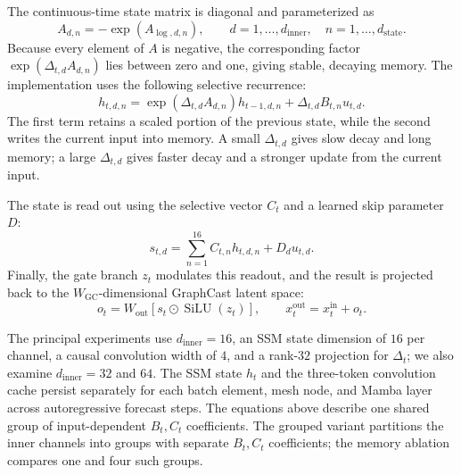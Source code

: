 \documentclass{article}
\begin{document}
The continuous-time state matrix is diagonal and parameterized as
\begin{equation}
    A_{d,n}=-\exp(A_{\log,d,n}),
    \qquad
    d=1,\ldots,d_{\textrm{inner}},\quad n=1,\ldots,d_{\textrm{state}}.
\end{equation}
Because every element of $A$ is negative, the corresponding factor $\exp(\Delta_{t,d}A_{d,n})$ lies between zero and one, giving stable, decaying memory. The implementation uses the following selective recurrence:
\begin{equation}
    h_{t,d,n}
    =
    \exp\!\left(\Delta_{t,d}A_{d,n}\right)h_{t-1,d,n}
    +
    \Delta_{t,d}B_{t,n}u_{t,d}.
\end{equation}
The first term retains a scaled portion of the previous state, while the second writes the current input into memory. A small $\Delta_{t,d}$ gives slow decay and long memory; a large $\Delta_{t,d}$ gives faster decay and a stronger update from the current input.

The state is read out using the selective vector $C_t$ and a learned skip parameter $D$:
\begin{equation}
    s_{t,d}
    =
    \sum_{n=1}^{16} C_{t,n}h_{t,d,n}
    +
    D_d u_{t,d}.
\end{equation}
Finally, the gate branch $z_t$ modulates this readout, and the result is projected back to the $W_{\textrm{GC}}$-dimensional GraphCast latent space:
\begin{equation}
    o_t
    =
    W_{\mathrm{out}}
    \left[
        s_t\odot\operatorname{SiLU}(z_t)
    \right],
    \qquad
    x_t^{\mathrm{out}}=x_t^{\mathrm{in}}+o_t.
\end{equation}

The principal experiments use $d_{\mathrm{inner}}=16$, an SSM state dimension of $16$ per channel, a causal convolution width of $4$, and a rank-$32$ projection for $\Delta_t$; we also examine $d_{\mathrm{inner}}=32$ and $64$. The SSM state $h_t$ and the three-token convolution cache persist separately for each batch element, mesh node, and Mamba layer across autoregressive forecast steps. The equations above describe one shared group of input-dependent $B_t,C_t$ coefficients. The grouped variant partitions the inner channels into groups with separate $B_t,C_t$ coefficients; the memory ablation compares one and four such groups.
\end{document}
